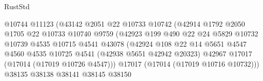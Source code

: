 \begin{lexlean}{RustStd}
\begin{coremodule}
                                          @10744
                                          @11123
                                          (@43142
                                            @2051
                                            @22
                                            @10733
                                            @10742
                                            (@42914
                                              @1792
                                              @2050
                                              @1705
                                              @22
                                              @10733
                                              @10740
                                              @9759
                                              (@42923
                                                @199
                                                @490
                                                @22
                                                @24
                                                @5829
                                                @10732
                                                @10739
                                                @4535
                                                @10715
                                                @4541
                                                @43078
                                                (@42924
                                                  @108
                                                  @22
                                                  @14
                                                  @5651
                                                  @4547
                                                  @4560
                                                  @4535
                                                  @10725
                                                  @4541
                                                  (@42938 @5651 @42942 @20323)
                                                  @42967
                                                  @17017
                                                  (@17014 (@17019 @10726 @4547)))
                                                @17017
                                                (@17014 (@17019 @10716 @10732)))
                                              @38135
                                              @38138
                                              @38141
                                              @38145
                                              @38150

\end{coremodule}
\end{lexlean}
